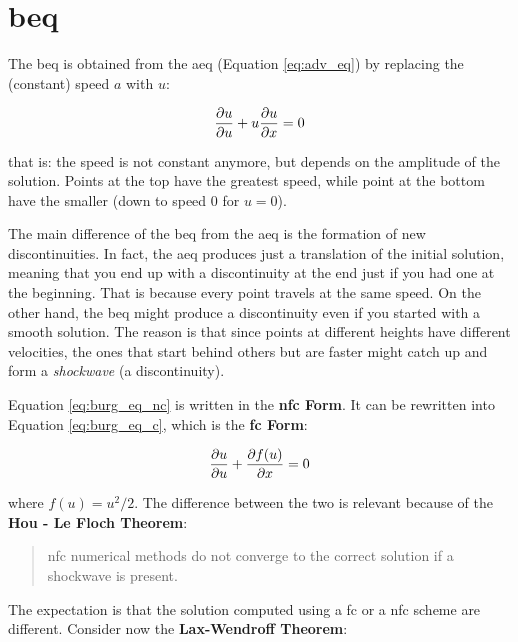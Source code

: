 \documentclass[11pt, a4paper]{article}
\begin{document}
\section{\acrfull{beq}}

The \acrlong{beq} is obtained from the \acrlong{aeq} (Equation \ref{eq:adv_eq}) by replacing the (constant) speed \(a\) with \(u\):

\begin{equation} \label{eq:burg_eq_nc}
    \pdv{u}{u} + u \pdv{u}{x} = 0
\end{equation}

\noindent
that is: the speed is not constant anymore, but depends on the amplitude of the solution. Points at the top have the greatest speed, while point at the bottom have the smaller (down to speed \(0\) for \(u = 0\)).

The main difference of the \acrshort{beq} from the \acrshort{aeq} is the formation of new discontinuities. In fact, the \acrshort{aeq} produces just a translation of the initial solution, meaning that you end up with a discontinuity at the end just if you had one at the beginning. That is because every point travels at the same speed. On the other hand, the \acrshort{beq} might produce a discontinuity even if you started with a smooth solution. The reason is that since points at different heights have different velocities, the ones that start behind others but are faster might catch up and form a \textit{shockwave} (a discontinuity).

Equation \ref{eq:burg_eq_nc} is written in the \textbf{\acrfull{nfc} Form}. It can be rewritten into Equation \ref{eq:burg_eq_c}, which is the \textbf{\acrfull{fc} Form}:

\begin{equation} \label{eq:burg_eq_c}
    \pdv{u}{u} + \pdv{f(u)}{x} = 0
\end{equation}

\noindent
where \(f(u) = u^2 / 2\). The difference between the two is relevant because of the \textbf{Hou - Le Floch Theorem}:

\begin{quote}
    \acrlong{nfc} numerical methods do not converge to the correct solution if a shockwave is present.
\end{quote}

\noindent
The expectation is that the solution computed using a \acrshort{fc} or a \acrshort{nfc} scheme are different. Consider now the \textbf{Lax-Wendroff Theorem}:
\end{document}
